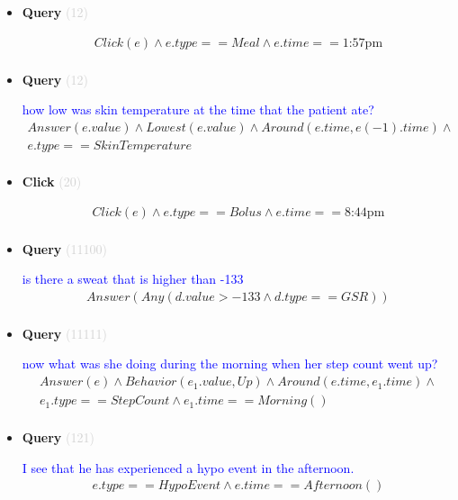 \documentclass[11pt]{article}
\newcommand{\key}[1]{\textcolor{lightgray}{#1}}
\newcounter{CQuery}
\newcounter{CClick}
\begin{document}
\begin{itemize}
\item
\textbf{Query\theCQuery} \key{(12)} \addtocounter{CQuery}{1}
\textcolor{blue}{  }
\begin{multline*}
Click(e) \wedge e.type == Meal \wedge e.time==\mbox{1:57pm} \\ 
\end{multline*}


\item
\textbf{Query\theCQuery} \key{(12)} \addtocounter{CQuery}{1}
\textcolor{blue}{ how low was skin temperature at the time that the patient ate? }
\begin{multline*}
Answer(e.value) \wedge Lowest(e.value) \wedge Around(e.time, e(-1).time) \wedge \\ 
e.type==SkinTemperature \\ 
\end{multline*}


\item
\textbf{Click\theCClick} \key{(20)} \addtocounter{CClick}{1}
\textcolor{blue}{  }
\begin{multline*}
Click(e) \wedge e.type==Bolus \wedge e.time==\mbox{8:44pm} \\ 
\end{multline*}


\item
\textbf{Query\theCQuery} \key{(11100)} \addtocounter{CQuery}{1}
\textcolor{blue}{ is there a sweat that is higher than -133 }
\begin{multline*}
Answer(Any(d.value>-133 \wedge d.type==GSR)) \\ 
\end{multline*}


\item
\textbf{Query\theCQuery} \key{(11111)} \addtocounter{CQuery}{1}
\textcolor{blue}{ now what was she doing during the morning when her step count went up? }
\begin{multline*}
Answer(e) \wedge Behavior(e_1.value, Up) \wedge Around(e.time, e_1.time) \wedge \\ 
e_1.type==StepCount \wedge e_1.time==Morning() \\ 
\end{multline*}


\item
\textbf{Query\theCQuery} \key{(121)} \addtocounter{CQuery}{1}
\textcolor{blue}{ I see that he has experienced a hypo event in the afternoon. }
\begin{multline*}
e.type==HypoEvent \wedge e.time==Afternoon() \\ 
\end{multline*}



\end{itemize}
\end{document}
